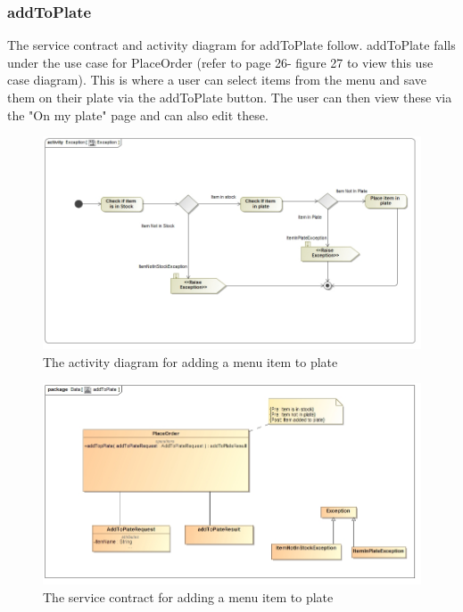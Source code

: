\documentclass[a4paper,12pt]{report}
\begin{document}
\subsubsection{addToPlate }
The service contract and activity diagram for addToPlate follow. addToPlate falls under the use case for PlaceOrder (refer to page 26- figure 27 to view this use case diagram). This is where a user can select items from the menu and save them on their plate via the addToPlate button. The user can then view these via the "On my plate" page and can also edit these.
\begin{figure}[H]
  \centering
    \includegraphics[width=1.0\textwidth]{../images/AddToPlateActivity.jpg}
    \caption{The activity diagram for adding a menu item to plate} 
\end{figure}
\begin{figure}[H]
  \centering
    \includegraphics[width=1.0\textwidth]{../images/addToPlateServicee.jpg}
    \caption{The service contract for adding a menu item to plate} 
\end{figure}
\end{document}
